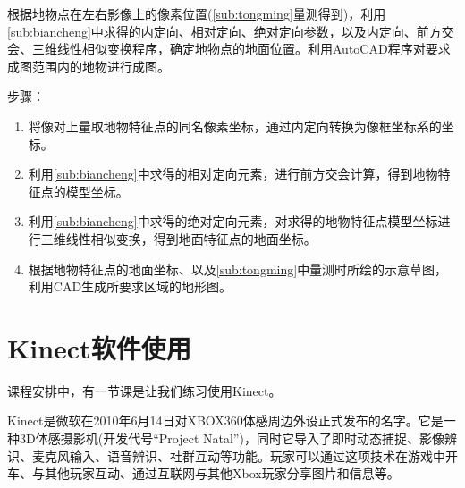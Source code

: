根据地物点在左右影像上的像素位置(\ref{sub:tongming}量测得到)，利用\ref{sub:biancheng}中求得的内定向、相对定向、绝对定向参数，以及内定向、前方交会、三维线性相似变换程序，确定地物点的地面位置。利用AutoCAD程序对要求成图范围内的地物进行成图。

步骤：
\begin{enumerate}
\item 将像对上量取地物特征点的同名像素坐标，通过内定向转换为像框坐标系的坐标。
\item 利用\ref{sub:biancheng}中求得的相对定向元素，进行前方交会计算，得到地物特征点的模型坐标。
\item 利用\ref{sub:biancheng}中求得的绝对定向元素，对求得的地物特征点模型坐标进行三维线性相似变换，得到地面特征点的地面坐标。
\item 根据地物特征点的地面坐标、以及\ref{sub:tongming}中量测时所绘的示意草图，利用CAD生成所要求区域的地形图。
\end{enumerate}





\section{Kinect软件使用}

课程安排中，有一节课是让我们练习使用Kinect。

Kinect是微软在2010年6月14日对XBOX360体感周边外设正式发布的名字。它是一种3D体感摄影机(开发代号“Project Natal”)，同时它导入了即时动态捕捉、影像辨识、麦克风输入、语音辨识、社群互动等功能。玩家可以通过这项技术在游戏中开车、与其他玩家互动、通过互联网与其他Xbox玩家分享图片和信息等。

